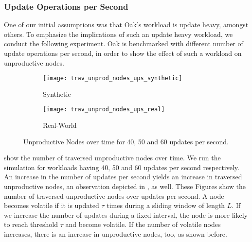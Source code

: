 \documentclass[abstracton,12pt]{scrartcl}
\theoremstyle{definition}
\begin{document}


\subsubsection{Update Operations per Second }

\label{sec:update-query-ratio}

One of our initial assumptions was that Oak's workload is update heavy, amongst others.
To emphasize the implications of such an update heavy workload, we conduct the following
experiment. Oak is benchmarked with different number of update operations per second,
in order to show the effect of such a workload on unproductive nodes. 

\begin{figure}[h]
  \centering
  \begin{subfigure}{0.49\linewidth}
    \centering
    \caption{Synthetic}
    \texttt{[image: trav\_unprod\_nodes\_ups\_synthetic]}
    \label{fig:trav_unprod_nodes_upt_synthetic}
  \end{subfigure}
  \begin{subfigure}{0.49\linewidth}
    \centering
    \caption{Real-World}
    \texttt{[image: trav\_unprod\_nodes\_ups\_real]}
    \label{fig:trav_unprod_nodes_upt_real}
  \end{subfigure}
  \vspace{-0.65cm}
  \caption[Unproductive Nodes over time for 40, 50 and 60 updates per second]{
  Unproductive Nodes over time for 40, 50 and 60 updates per second.}
\end{figure}


 show
the number of traversed unproductive nodes over time. We run the simulation for
workloads having 40, 50 and 60 updates per second respectively.
An increase in the number of updates per second
yields an increase in traversed unproductive nodes, an observation
depicted in , as well.
These Figures show the number of traversed unproductive nodes over updates
per second.
A node becomes volatile if it is updated $\tau$ times during a sliding window of length $L$.
If we increase the number of updates during a fixed interval, the node is more likely 
to reach threshold $\tau$ and become volatile.
If the number of volatile nodes increases, there is an increase in unproductive nodes, too,
as shown before.
\end{document}
